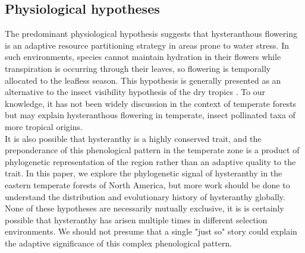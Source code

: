 \documentclass{article}
\begin{document}
\subsection*{Physiological hypotheses}
\indent The predominant physiological hypothesis suggests that hysteranthous flowering is an adaptive resource partitioning strategy in areas prone to water stress. In such environments, species cannot maintain hydration in their flowers while transpiration is occurring through their leaves, so flowering is temporally allocated to the leafless season. This hypothesis is generally presented as an alternative to the insect visibility hypothesis of the dry tropics \citep{Franklin2016}. To our knowledge, it has not been widely discussion in the context of temperate forests but may explain hysteranthous flowering in temperate, insect pollinated taxa of more tropical origins.\\%
\indent It is also possible that hysteranthy is a highly conserved trait, and the preponderance of this phenological pattern in the temperate zone is a product of phylogenetic representation of the region rather than an adaptive quality to the trait. In this paper, we explore the phylogenetic signal of hysteranthy in the eastern temperate forests of North America, but more work should be done to understand the distribution and evolutionary history of hysteranthy globally.\\
\indent None of these hypotheses are necessarily mutually exclusive, it is is certainly possible that hysteranthy has arisen multiple times in different selection environments. We should not presume that a single "just so" story could explain the adaptive significance of this complex phenological pattern.\\
\end{document}
